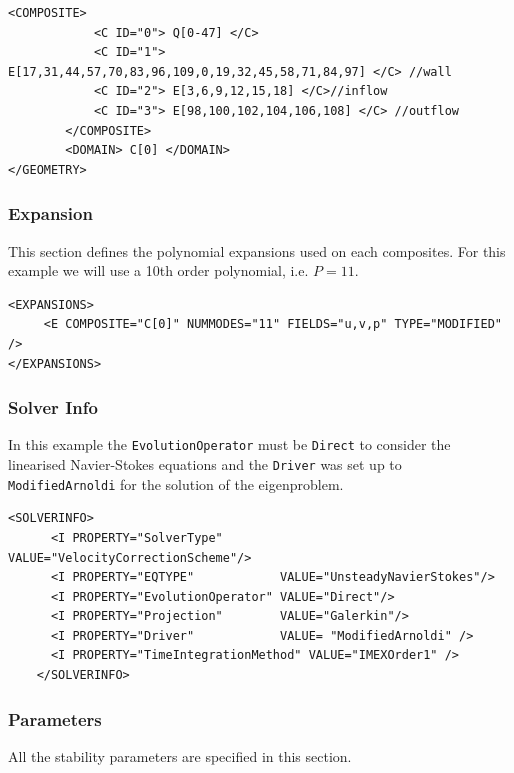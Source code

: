   \begin{lstlisting}[style=XMLStyle]
              <COMPOSITE>
            <C ID="0"> Q[0-47] </C>
            <C ID="1"> E[17,31,44,57,70,83,96,109,0,19,32,45,58,71,84,97] </C> //wall
            <C ID="2"> E[3,6,9,12,15,18] </C>//inflow
            <C ID="3"> E[98,100,102,104,106,108] </C> //outflow
        </COMPOSITE>
        <DOMAIN> C[0] </DOMAIN>
</GEOMETRY>
  \end{lstlisting}

  \subsubsection{Expansion}

  This section defines the polynomial expansions used on each composites. For this example we will use a 10th order polynomial, i.e. $P=11$.

  \begin{lstlisting}[style=XMLStyle]
<EXPANSIONS>
     <E COMPOSITE="C[0]" NUMMODES="11" FIELDS="u,v,p" TYPE="MODIFIED" />
</EXPANSIONS>
  \end{lstlisting}

  \subsubsection{Solver Info}

  In this example the \texttt{EvolutionOperator} must be \texttt{Direct} to consider the linearised Navier-Stokes equations and the \texttt{Driver} was set up to \texttt{ModifiedArnoldi} for the solution of the eigenproblem.

    \begin{lstlisting}[style=XMLStyle]
      <SOLVERINFO>
      <I PROPERTY="SolverType"        VALUE="VelocityCorrectionScheme"/>
      <I PROPERTY="EQTYPE"            VALUE="UnsteadyNavierStokes"/>
      <I PROPERTY="EvolutionOperator" VALUE="Direct"/>
      <I PROPERTY="Projection"        VALUE="Galerkin"/>
      <I PROPERTY="Driver"            VALUE= "ModifiedArnoldi" />
      <I PROPERTY="TimeIntegrationMethod" VALUE="IMEXOrder1" />
    </SOLVERINFO>
      \end{lstlisting}


\subsubsection{Parameters}

All the stability parameters are specified in this section.


